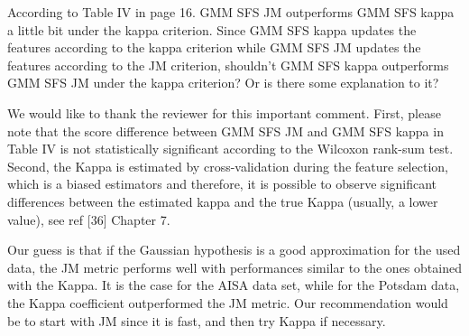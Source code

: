 \documentclass[a4paper,10pt,DIV=16]{scrartcl}
\begin{document}
\begin{revbox}
  According to Table IV in page 16. GMM SFS JM outperforms GMM SFS kappa a little bit under the kappa criterion. Since GMM SFS kappa updates the features according to the kappa criterion while GMM SFS JM updates the features according to the JM criterion, shouldn’t GMM SFS kappa outperforms GMM SFS JM under the kappa criterion? Or is there some explanation to it?
  \begin{resbox}
    We would like to thank the reviewer for this important comment. First, please note that the score difference between GMM SFS JM and GMM SFS kappa in Table IV is not statistically significant according to the Wilcoxon rank-sum test. Second, the Kappa is estimated by cross-validation during the feature selection, which is a  biased estimators and therefore, it is possible to observe significant differences between the estimated kappa and the true Kappa (usually, a lower value), see ref [36] Chapter 7.

    Our guess is that if the Gaussian hypothesis is a good approximation for the used data, the JM metric performs well  with  performances similar to the ones obtained with the Kappa. It is the case for the AISA data set, while for the Potsdam data, the Kappa coefficient outperformed the JM metric. Our recommendation would be to start with JM since it is fast, and then try Kappa if necessary.
  \end{resbox}
\end{revbox}
\end{document}
